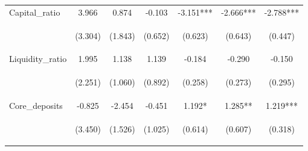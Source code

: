 \documentclass[]{article}
\begin{document}
\begin{center}
\begin{tabular}{lcccccc}
Capital\_ratio & 3.966 & 0.874 & -0.103 & -3.151*** & -2.666*** & -2.788*** \\
\vspace{4pt} & \begin{footnotesize}(3.304)\end{footnotesize} & \begin{footnotesize}(1.843)\end{footnotesize} & \begin{footnotesize}(0.652)\end{footnotesize} & \begin{footnotesize}(0.623)\end{footnotesize} & \begin{footnotesize}(0.643)\end{footnotesize} & \begin{footnotesize}(0.447)\end{footnotesize} \\
Liquidity\_ratio & 1.995 & 1.138 & 1.139 & -0.184 & -0.290 & -0.150 \\
\vspace{4pt} & \begin{footnotesize}(2.251)\end{footnotesize} & \begin{footnotesize}(1.060)\end{footnotesize} & \begin{footnotesize}(0.892)\end{footnotesize} & \begin{footnotesize}(0.258)\end{footnotesize} & \begin{footnotesize}(0.273)\end{footnotesize} & \begin{footnotesize}(0.295)\end{footnotesize} \\
Core\_deposits & -0.825 & -2.454 & -0.451 & 1.192* & 1.285** & 1.219*** \\
\vspace{4pt} & \begin{footnotesize}(3.450)\end{footnotesize} & \begin{footnotesize}(1.526)\end{footnotesize} & \begin{footnotesize}(1.025)\end{footnotesize} & \begin{footnotesize}(0.614)\end{footnotesize} & \begin{footnotesize}(0.607)\end{footnotesize} & \begin{footnotesize}(0.318)\end{footnotesize} \\

\end{tabular}
\end{center}
\end{document}
